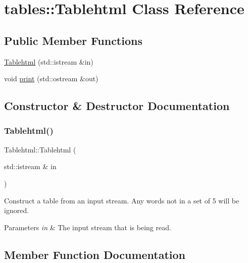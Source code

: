 \hypertarget{classtables_1_1_tablehtml}{}\section{tables\+:\+:Tablehtml Class Reference}
\label{classtables_1_1_tablehtml}
\subsection*{Public Member Functions}
\begin{DoxyCompactItemize}
\item 
\hyperlink{classtables_1_1_tablehtml_a2ed5557a792802586aab2bc0598e22a5}{Tablehtml} (std\+::istream \&in)
\item 
void \hyperlink{classtables_1_1_tablehtml_a8cec3bade82ab4eaccbf74faf207bb2e}{print} (std\+::ostream \&out)
\end{DoxyCompactItemize}


\subsection{Constructor \& Destructor Documentation}
\hypertarget{classtables_1_1_tablehtml_a2ed5557a792802586aab2bc0598e22a5}{}\label{classtables_1_1_tablehtml_a2ed5557a792802586aab2bc0598e22a5} 
\subsubsection{\texorpdfstring{Tablehtml()}{Tablehtml()}}
{\footnotesize\ttfamily Tablehtml\+::\+Tablehtml (\begin{DoxyParamCaption}\item[{std\+::istream \&}]{in }\end{DoxyParamCaption})}

Construct a table from an input stream. Any words not in a set of 5 will be ignored. 
\begin{DoxyParams}{Parameters}
{\em in} & The input stream that is being read. \\
\hline
\end{DoxyParams}


\subsection{Member Function Documentation}
\hypertarget{classtables_1_1_tablehtml_a8cec3bade82ab4eaccbf74faf207bb2e}{}\label{classtables_1_1_tablehtml_a8cec3bade82ab4eaccbf74faf207bb2e} 
